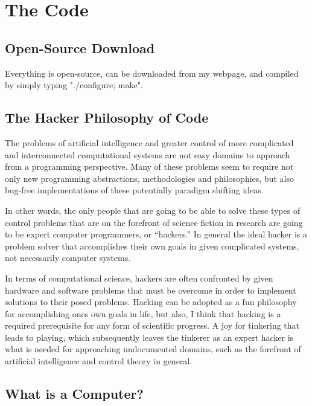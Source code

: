 \chapter{The Code}\label{appendix:the_code}

\section{Open-Source Download}

Everything is open-source, can be downloaded from my webpage, and
compiled by simply typing "./configure; make".

\section{The Hacker Philosophy of Code}

The problems of artificial intelligence and greater control of more
complicated and interconnected computational systems are not easy
domains to approach from a programming perspective.  Many of these
problems seem to require not only new programming abstractions,
methodologies and philosophies, but also bug-free implementations of
these potentially paradigm shifting ideas.

In other words, the only people that are going to be able to solve
these types of control problems that are on the forefront of science
fiction in research are going to be expert computer programmers, or
``hackers.''  In general the ideal hacker is a problem solver that
accomplishes their own goals in given complicated systems, not
necessarily computer systems.

In terms of computational science, hackers are often confronted by
given hardware and software problems that must be overcome in order to
implement solutions to their posed problems.  Hacking can be adopted
as a fun philosophy for accomplishing ones own goals in life, but
also, I think that hacking is a required prerequisite for any form of
scientific progress.  A joy for tinkering that leads to playing, which
subsequently leaves the tinkerer as an expert hacker is what is needed
for approaching undocumented domains, such as the forefront of
artificial intelligence and control theory in general.

\section{What is a Computer?}

